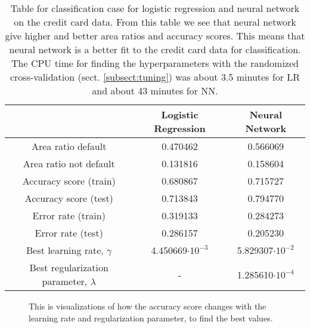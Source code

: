 \documentclass[12pt,a4paper,english]{article}
\begin{document}
\begin{table}[htbp!]
	\centering
	\begin{tabular}{ |c|c|c| }
		\hline \rule{0pt}{13pt}
		 & Logistic Regression & Neural Network \\
		\hline \rule{0pt}{13pt}
		Area ratio default & 0.470462 & 0.566069  \\
		\hline \rule{0pt}{13pt}
		Area ratio not default & 0.131816 & 0.158604 \\
		\hline \rule{0pt}{13pt}
		Accuracy score (train) & 0.680867 & 0.715727 \\
		\hline \rule{0pt}{13pt}
		Accuracy score (test) & 0.713843 & 0.794770 \\
		\hline \rule{0pt}{13pt}
		Error rate (train) & 0.319133 & 0.284273 \\
		\hline \rule{0pt}{13pt}
		Error rate (test) & 0.286157 & 0.205230 \\
		\hline \rule{0pt}{13pt}
		Best learning rate, $\gamma$ & 4.450669$\cdot10^{-3}$ & 5.829307$\cdot10^{-2}$ \\
		\hline \rule{0pt}{13pt}
		Best regularization parameter, $\lambda$ & - & 1.285610$\cdot10^{-4}$ \\
		\hline
	\end{tabular}	
	\caption{Table for classification case for logistic regression and neural network on the credit card data. From this table we see that neural network give higher and better area ratios and accuracy scores. This means that neural network is a better fit to the credit card data for classification. The CPU time for finding the hyperparameters with the randomized cross-validation (sect. \ref{subsect:tuning}) was about 3.5 minutes for LR and about 43 minutes for NN.
	\label{tab:logreg}}
\end{table}
\begin{figure}[htbp]
	\hspace{0.5em}
	\caption{This is visualizations of how the accuracy score changes with the learning rate and regularization parameter, to find the best values.\label{fig:class_best_params}}
\end{figure}
\end{document}
